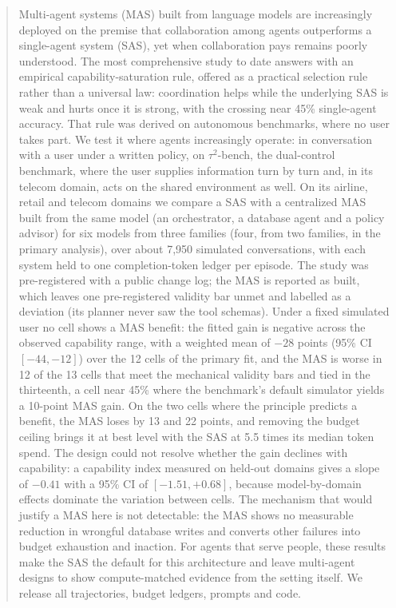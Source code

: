 \begin{abstract}
Multi-agent systems (MAS) built from language models are increasingly deployed on the premise that collaboration among agents outperforms a single-agent system (SAS), yet when collaboration pays remains poorly understood. The most comprehensive study to date answers with an empirical capability-saturation rule, offered as a practical selection rule rather than a universal law: coordination helps while the underlying SAS is weak and hurts once it is strong, with the crossing near 45\% single-agent accuracy. That rule was derived on autonomous benchmarks, where no user takes part. We test it where agents increasingly operate: in conversation with a user under a written policy, on $\tau^2$-bench, the dual-control benchmark, where the user supplies information turn by turn and, in its telecom domain, acts on the shared environment as well. On its airline, retail and telecom domains we compare a SAS with a centralized MAS built from the same model (an orchestrator, a database agent and a policy advisor) for six models from three families (four, from two families, in the primary analysis), over about 7,950 simulated conversations, with each system held to one completion-token ledger per episode. The study was pre-registered with a public change log; the MAS is reported as built, which leaves one pre-registered validity bar unmet and labelled as a deviation (its planner never saw the tool schemas). Under a fixed simulated user no cell shows a MAS benefit: the fitted gain is negative across the observed capability range, with a weighted mean of $-28$ points (95\% CI $[-44, -12]$) over the 12 cells of the primary fit, and the MAS is worse in 12 of the 13 cells that meet the mechanical validity bars and tied in the thirteenth, a cell near 45\% where the benchmark's default simulator yields a 10-point MAS gain. On the two cells where the principle predicts a benefit, the MAS loses by 13 and 22 points, and removing the budget ceiling brings it at best level with the SAS at 5.5 times its median token spend. The design could not resolve whether the gain declines with capability: a capability index measured on held-out domains gives a slope of $-0.41$ with a 95\% CI of $[-1.51, +0.68]$, because model-by-domain effects dominate the variation between cells. The mechanism that would justify a MAS here is not detectable: the MAS shows no measurable reduction in wrongful database writes and converts other failures into budget exhaustion and inaction. For agents that serve people, these results make the SAS the default for this architecture and leave multi-agent designs to show compute-matched evidence from the setting itself. We release all trajectories, budget ledgers, prompts and code.
\end{abstract}
